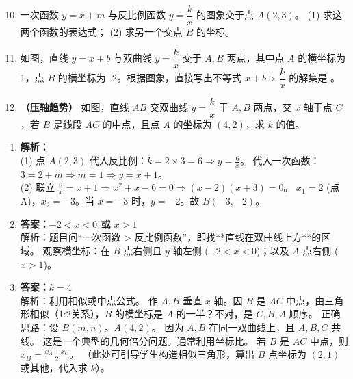 \documentclass[12pt, a4paper]{article}
\begin{document}
\begin{examplebox}
    \begin{enumerate}[label=\textbf{例\arabic*.}]
        \setcounter{enumii}{9}
        \item 一次函数 $y = x + m$ 与反比例函数 $y = \dfrac{k}{x}$ 的图象交于点 $A(2, 3)$。
        (1) 求这两个函数的表达式；
        (2) 求另一个交点 $B$ 的坐标。
        
        \item 如图，直线 $y = x + b$ 与双曲线 $y = \dfrac{k}{x}$ 交于 $A, B$ 两点，其中点 $A$ 的横坐标为 1，点 $B$ 的横坐标为 -2。根据图象，直接写出不等式 $x + b > \dfrac{k}{x}$ 的解集是 \underline{\hspace{2cm}}。
        
        \item \textbf{（压轴趋势）} 如图，直线 $AB$ 交双曲线 $y=\dfrac{k}{x}$ 于 $A, B$ 两点，交 $x$ 轴于点 $C$，若 $B$ 是线段 $AC$ 的中点，且点 $A$ 的坐标为 $(4, 2)$，求 $k$ 的值。
    \end{enumerate}
\end{examplebox}

\begin{answerbox}
    \begin{enumerate}
        \item \textbf{解析：} \\
        (1) 点 $A(2,3)$ 代入反比例：$k = 2 \times 3 = 6 \Rightarrow y = \frac{6}{x}$。
        代入一次函数：$3 = 2 + m \Rightarrow m = 1 \Rightarrow y = x + 1$。\\
        (2) 联立 $\frac{6}{x} = x + 1 \Rightarrow x^2 + x - 6 = 0 \Rightarrow (x-2)(x+3)=0$。
        $x_1=2$ (点A)，$x_2=-3$。当 $x=-3$ 时，$y=-2$。故 $B(-3, -2)$。
        
        \item \textbf{答案：$ -2 < x < 0 $ 或 $ x > 1 $} \\
        解析：题目问“一次函数 > 反比例函数”，即找**直线在双曲线上方**的区域。
        观察横坐标：在 $B$ 点右侧且 $y$ 轴左侧 ($-2 < x < 0$)；以及 $A$ 点右侧 ($x > 1$)。
        
        \item \textbf{答案：$k = 4$} \\
        解析：利用相似或中点公式。
        作 $A, B$ 垂直 $x$ 轴。因 $B$ 是 $AC$ 中点，由三角形相似（1:2关系），$B$ 的横坐标是 $A$ 的一半？不对，是 $C, B, A$ 顺序。
        正确思路：设 $B(m, n)$。$A(4, 2)$。
        因为 $A, B$ 在同一双曲线上，且 $A, B, C$ 共线。
        这是一个典型的几何倍分问题。通常利用坐标比。
        若 $B$ 是 $AC$ 中点，则 $x_B = \frac{x_A + x_C}{2}$。
        （此处可引导学生构造相似三角形，算出 $B$ 点坐标为 $(2, 1)$ 或其他，代入求 $k$）。
    \end{enumerate}
\end{answerbox}
\end{document}
